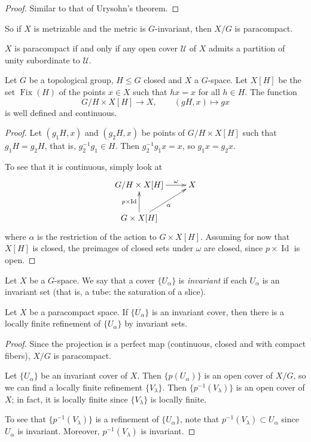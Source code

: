 \begin{proof}
Similar to that of Urysohn's theorem.
\end{proof}

So if $X$ is metrizable and the metric
is $G$-invariant, then $X/G$ is
paracompact.

\begin{theorem}
\label{theorem-paracompact-partitions}
$X$ is paracompact if and only if any
open cover $\mathcal{U}$ of $X$ admits
a partition of unity subordinate to
$\mathcal{U}$.
\end{theorem}

\begin{proposition}
\label{proposition-map-from-fixed-points}
Let $G$ be a topological group,
$H\leq G$ closed and $X$ a $G$-space.
Let $X[H]$ be the set
$\operatorname{Fix}(H)$ of the points
$x\in X$ such that $hx=x$ for all
$h\in H$. The function
$$
G/H\times X[H]\to X,
\qquad
(gH,x)\mapsto gx
$$
is well defined and continuous.
\end{proposition}

\begin{proof}
Let $(g_1H,x)$ and $(g_2H,x)$ be points
of $G/H\times X[H]$ such that
$g_1H=g_2H$, that is,
$g_2^{-1}g_1\in H$. Then
$g_2^{-1}g_1x=x$, so $g_1x=g_2x$.

To see that it is continuous, simply
look at
$$
\xymatrix{
G/H\times X[H] \ar[r]^-{\omega}
  & X \\
G\times X[H] \ar[ur]_{\alpha}
  \ar[u]^{p\times\operatorname{Id}}
}
$$
where $\alpha$ is the restriction of
the action to $G\times X[H]$. Assuming
for now that $X[H]$ is closed, the
preimages of closed sets under $\omega$
are closed, since
$p\times\operatorname{Id}$ is open.
\end{proof}

\begin{definition}
\label{definition-invariant-cover}
Let $X$ be a $G$-space. We say that a
cover $\{U_\alpha\}$ is
{\it invariant} if each $U_\alpha$ is
an invariant set (that is, a tube: the
saturation of a slice).
\end{definition}

\begin{proposition}
\label{proposition-invariant-refinement}
Let $X$ be a paracompact space. If
$\{U_\alpha\}$ is an invariant cover,
then there is a locally finite
refinement of $\{U_\alpha\}$ by
invariant sets.
\end{proposition}

\begin{proof}
Since the projection is a perfect map
(continuous, closed and with compact
fibers), $X/G$ is paracompact.

Let $\{U_\alpha\}$ be an invariant
cover of $X$. Then $\{p(U_\alpha)\}$ is
an open cover of $X/G$, so we can find
a locally finite refinement
$\{V_\lambda\}$. Then
$\{p^{-1}(V_\lambda)\}$ is an open
cover of $X$; in fact, it is locally
finite since $\{V_\lambda\}$ is locally
finite.

To see that $\{p^{-1}(V_\lambda)\}$ is
a refinement of $\{U_\alpha\}$, note
that $p^{-1}(V_\lambda)\subset U_\alpha$
since $U_\alpha$ is invariant.
Moreover, $p^{-1}(V_\lambda)$ is
invariant.
\end{proof}

